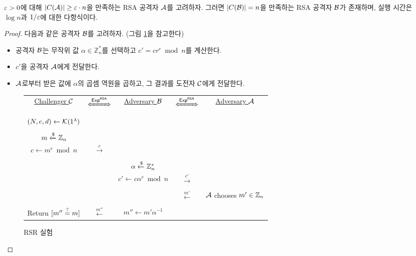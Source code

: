 \begin{tcolorbox}[colback=white, boxrule=0.7pt, sharp corners] 
    \begin{theorem}
        $\varepsilon > 0$에 대해 $|C(\mathcal{A})| \geq \varepsilon \cdot n$을 만족하는 RSA 공격자
        $\mathcal{A}$를 고려하자. 그러면 $|C(\mathcal{B})| = n$을 만족하는 RSA 공격자 $\mathcal{B}$가
        존재하며, 실행 시간은 $\log n$과 $1/\varepsilon$에 대한 다항식이다.
    \end{theorem}
\end{tcolorbox}

\begin{proof}
    다음과 같은 공격자 $\mathcal{B}$를 고려하자. (그림 \ref{fig:rsr}을 참고한다)
    \begin{itemize}
        \item 공격자 $\mathcal{B}$는 무작위 값 $\alpha \in \mathbb{Z}_n^*$를 선택하고 $c' =
        cr^e \bmod n$를 계산한다. 
        \item $c'$을 공격자 $\mathcal{A}$에게 전달한다.
        \item $\mathcal{A}$로부터 받은 값에 $\alpha$의 곱셈 역원을 곱하고, 그 결과를 도전자
        $\mathcal{C}$에게 전달한다.
    \end{itemize}

    \begin{figure}[ht]
        \begin{tcolorbox}[colback=white]
        \centering
            \begin{tabularx}{\linewidth}{CcCcC}
                \underline{Challenger $\mathcal{C}$} & $\xLeftrightarrow{\EXP^{\RSA}}$ & \underline{Adversary $\mathcal{B}$} & $\xLeftrightarrow{\EXP^{\RSA}}$ & \underline{Adversary $\mathcal{A}$} \\
                \\
                $(N, e, d) \gets \mathcal{K}(1^{\lambda})$ & & & & \\
                \\
                $m \xleftarrow{\$} \mathbb{Z}_n$ & & & & \\
                $c \gets m^e \bmod n$ & $\xrightarrow{c}$ & & & \\
                \\
                & & $\alpha \xleftarrow{\$} \mathbb{Z}^*_n$ & & \\
                & & $c' \gets c \alpha^e \bmod n$ & $\xrightarrow{c'}$ & \\
                \\
                & & & $\xleftarrow{m'}$ & $\mathcal{A}$ chooses $m' \in \mathbb{Z}_n$ \\
                \\
                Return $[m'' \overset{?}{=} m]$ & $\xleftarrow{m''}$ & $m'' \gets m' \alpha^{-1}$ & & \\
            \end{tabularx}  
        \end{tcolorbox}
        \caption{RSR 실험}
        \label{fig:rsr}
    \end{figure}


\end{proof}
